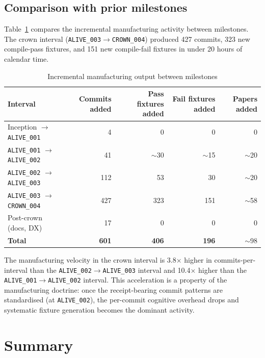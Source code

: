 \subsection{Comparison with prior milestones}
\label{ssec:crown-velocity-comparison}

Table~\ref{tab:velocity-comparison} compares the incremental manufacturing
activity between milestones. The crown interval (\texttt{ALIVE\_003}$\to$\texttt{CROWN\_004})
produced 427 commits, 323 new compile-pass fixtures, and 151 new compile-fail
fixtures in under 20 hours of calendar time.

\begin{table}[ht]
\centering
\caption{Incremental manufacturing output between milestones}
\label{tab:velocity-comparison}
\begin{tabular}{@{}lrrrr@{}}
\toprule
Interval & Commits added & Pass fixtures added & Fail fixtures added & Papers added \\
\midrule
Inception $\to$ \texttt{ALIVE\_001}            &   4 &   0 &   0 &   0 \\
\texttt{ALIVE\_001} $\to$ \texttt{ALIVE\_002}  &  41 & $\sim$30 & $\sim$15 & $\sim$20 \\
\texttt{ALIVE\_002} $\to$ \texttt{ALIVE\_003}  & 112 &  53 &  30 & $\sim$20 \\
\texttt{ALIVE\_003} $\to$ \texttt{CROWN\_004}  & 427 & 323 & 151 & $\sim$58 \\
Post-crown (docs, DX)                          &  17 &   0 &   0 &   0 \\
\midrule
\textbf{Total}                                 & \textbf{601} & \textbf{406} & \textbf{196} & $\sim$98 \\
\bottomrule
\end{tabular}
\end{table}

The manufacturing velocity in the crown interval is 3.8$\times$ higher in
commits-per-interval than the \texttt{ALIVE\_002}$\to$\texttt{ALIVE\_003}
interval and 10.4$\times$ higher than the \texttt{ALIVE\_001}$\to$\texttt{ALIVE\_002}
interval. This acceleration is a property of the manufacturing doctrine: once
the receipt-bearing commit patterns are standardised (at \texttt{ALIVE\_002}),
the per-commit cognitive overhead drops and systematic fixture generation
becomes the dominant activity.

\section{Summary}
\label{sec:crown-summary}

